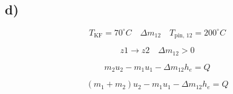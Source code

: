 

\subsection*{d)}

\begin{equation*}
T_{\text{KF}} = 70^\circ C \quad \Delta m_{12} \quad T_{\text{pin, 12}} = 200^\circ C
\end{equation*}

\begin{equation*}
z1 \rightarrow z2 \quad \Delta m_{12} > 0
\end{equation*}

\begin{equation*}
m_{2} u_{2} - m_{1} u_{1} - \Delta m_{12} h_{e} = Q
\end{equation*}

\begin{equation*}
(m_{1} + m_{2}) u_{2} - m_{1} u_{1} - \Delta m_{12} h_{e} = Q
\end{equation*}

